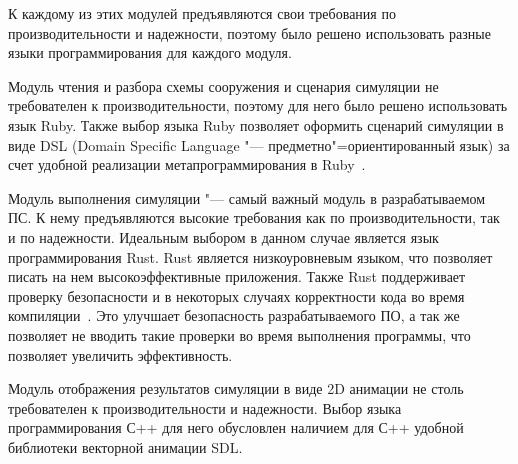 К каждому из этих модулей предъявляются свои требования по производительности и надежности, поэтому было решено использовать разные языки программирования для каждого модуля.

Модуль чтения и разбора схемы сооружения и сценария симуляции не требователен к производительности, поэтому для него было решено использовать язык Ruby.
Также выбор языка Ruby позволяет оформить сценарий симуляции в виде DSL (Domain Specific Language "--- предметно"=ориентированный язык) за счет удобной реализации метапрограммирования в Ruby~\cite{ruby_main}.

Модуль выполнения симуляции "--- самый важный модуль в разрабатываемом ПС. К нему предъявляются высокие требования как по производительности, так и по надежности.
Идеальным выбором в данном случае является язык программирования Rust. Rust является низкоуровневым языком, что позволяет писать на нем высокоэффективные приложения.
Также Rust поддерживает проверку безопасности и в некоторых случаях корректности кода во время компиляции~\cite{rust_main}.
Это улучшает безопасность разрабатываемого ПО, а так же позволяет не вводить такие проверки во время выполнения программы, что позволяет увеличить эффективность.

Модуль отображения результатов симуляции в виде 2D анимации не столь требователен к производительности и надежности.
Выбор языка программирования С++ для него обусловлен наличием для С++ удобной библиотеки векторной анимации SDL.
